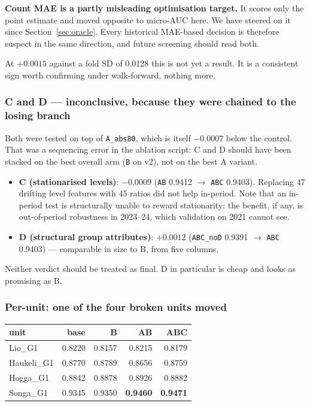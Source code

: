 \begin{finding}[Methodological]
\textbf{Count MAE is a partly misleading optimisation target.} It scores only the point estimate
and moved opposite to micro-AUC here. We have steered on it since Section~\ref{sec:oracle}.
Every historical MAE-based decision is therefore suspect in the same direction, and future
screening should read both.
\end{finding}

At $+0.0015$ against a fold SD of 0.0128 this is not yet a result. It is a consistent sign worth
confirming under walk-forward, nothing more.

\subsubsection*{C and D --- inconclusive, because they were chained to the losing branch}

Both were tested on top of \texttt{A\_abs80}, which is itself $-0.0007$ below the control. That
was a sequencing error in the ablation script: C and D should have been stacked on the best
overall arm (\texttt{B} on v2), not on the best A variant.

\begin{itemize}
  \item \textbf{C (stationarised levels)}: $-0.0009$ (\texttt{AB} 0.9412 $\to$ \texttt{ABC}
        0.9403). Replacing 47 drifting level features with 45 ratios did not help in-period.
        Note that an in-period test is structurally unable to reward stationarity: the benefit,
        if any, is out-of-period robustness in 2023--24, which validation on 2021 cannot see.
  \item \textbf{D (structural group attributes)}: $+0.0012$ (\texttt{ABC\_noD} 0.9391 $\to$
        \texttt{ABC} 0.9403) --- comparable in size to B, from five columns.
\end{itemize}

Neither verdict should be treated as final. D in particular is cheap and looks as promising as B.

\subsubsection*{Per-unit: one of the four broken units moved}

\begin{center}\small
\begin{tabular}{lrrrr}
\toprule
unit & base & B & AB & ABC \\
\midrule
Lio\_G1     & 0.8220 & 0.8157 & 0.8215 & 0.8179 \\
Haukeli\_G1 & 0.8770 & 0.8789 & 0.8656 & 0.8759 \\
Hogga\_G1   & 0.8842 & 0.8878 & 0.8926 & 0.8882 \\
Songa\_G1   & 0.9345 & 0.9350 & \textbf{0.9460} & \textbf{0.9471} \\
\bottomrule
\end{tabular}
\end{center}

